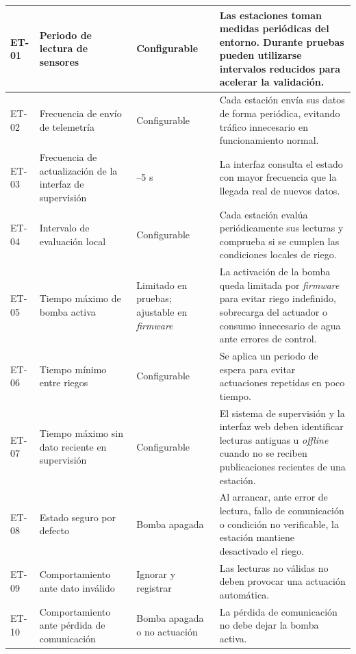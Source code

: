 \begin{longtable}{|
>{\raggedright\arraybackslash}p{}|
>{\raggedright\arraybackslash}p{}|
>{\raggedright\arraybackslash}p{}|
>{\raggedright\arraybackslash}p{}|}
ET-01 & Periodo de lectura de sensores & Configurable & Las estaciones toman medidas periódicas del entorno. Durante pruebas pueden utilizarse intervalos reducidos para acelerar la validación. \\
\hline
ET-02 & Frecuencia de envío de telemetría & Configurable & Cada estación envía sus datos de forma periódica, evitando tráfico innecesario en funcionamiento normal. \\
\hline
ET-03 & Frecuencia de actualización de la interfaz de supervisión & 3--5 s & La interfaz consulta el estado con mayor frecuencia que la llegada real de nuevos datos. \\
\hline
ET-04 & Intervalo de evaluación local & Configurable & Cada estación evalúa periódicamente sus lecturas y comprueba si se cumplen las condiciones locales de riego. \\
\hline
ET-05 & Tiempo máximo de bomba activa & Limitado en pruebas; ajustable en \textit{firmware} & La activación de la bomba queda limitada por \textit{firmware} para evitar riego indefinido, sobrecarga del actuador o consumo innecesario de agua ante errores de control. \\
\hline
ET-06 & Tiempo mínimo entre riegos & Configurable & Se aplica un periodo de espera para evitar actuaciones repetidas en poco tiempo. \\
\hline
ET-07 & Tiempo máximo sin dato reciente en supervisión & Configurable & El sistema de supervisión y la interfaz web deben identificar lecturas antiguas u \textit{offline} cuando no se reciben publicaciones recientes de una estación. \\
\hline
ET-08 & Estado seguro por defecto & Bomba apagada & Al arrancar, ante error de lectura, fallo de comunicación o condición no verificable, la estación mantiene desactivado el riego. \\
\hline
ET-09 & Comportamiento ante dato inválido & Ignorar y registrar & Las lecturas no válidas no deben provocar una actuación automática. \\
\hline
ET-10 & Comportamiento ante pérdida de comunicación & Bomba apagada o no actuación & La pérdida de comunicación no debe dejar la bomba activa. \\
\hline

\end{longtable}

\normalsize
\endgroup

